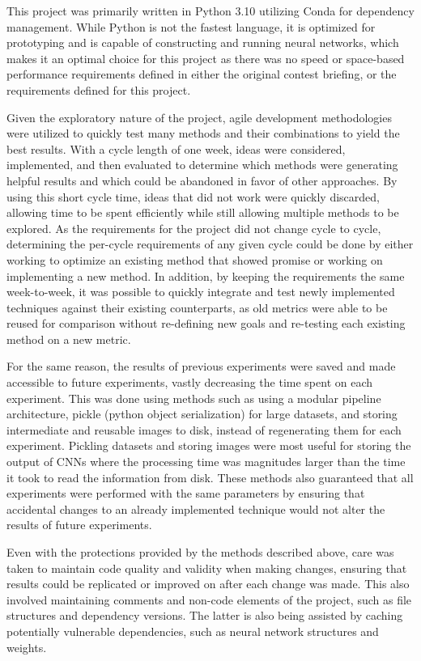 This project was primarily written in Python 3.10 utilizing Conda for dependency management. While Python is not the fastest language, it is optimized for prototyping and is capable of constructing and running neural networks, which makes it an optimal choice for this project as there was no speed or space-based performance requirements defined in either the original contest briefing, or the requirements defined for this project.

Given the exploratory nature of the project, agile development methodologies were utilized to quickly test many methods and their combinations to yield the best results. With a cycle length of one week, ideas were considered, implemented, and then evaluated to determine which methods were generating helpful results and which could be abandoned in favor of other approaches. By using this short cycle time, ideas that did not work were quickly discarded, allowing time to be spent efficiently while still allowing multiple methods to be explored. As the requirements for the project did not change cycle to cycle, determining the per-cycle requirements of any given cycle could be done by either working to optimize an existing method that showed promise or working on implementing a new method. In addition, by keeping the requirements the same week-to-week, it was possible to quickly integrate and test newly implemented techniques against their existing counterparts, as old metrics were able to be reused for comparison without re-defining new goals and re-testing each existing method on a new metric.

For the same reason, the results of previous experiments were saved and made accessible to future experiments, vastly decreasing the time spent on each experiment. This was done using methods such as using a modular pipeline architecture, pickle\cite{pickle} (python object serialization) for large datasets, and storing intermediate and reusable images to disk, instead of regenerating them for each experiment. Pickling datasets and storing images were most useful for storing the output of CNNs where the processing time was magnitudes larger than the time it took to read the information from disk. These methods also guaranteed that all experiments were performed with the same parameters by ensuring that accidental changes to an already implemented technique would not alter the results of future experiments.

Even with the protections provided by the methods described above, care was taken to maintain code quality and validity when making changes, ensuring that results could be replicated or improved on after each change was made. This also involved maintaining comments and non-code elements of the project, such as file structures and dependency versions. The latter is also being assisted by caching potentially vulnerable dependencies, such as neural network structures and weights.
